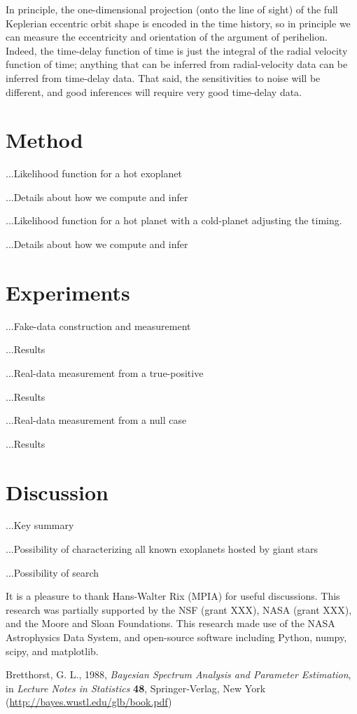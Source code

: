 \documentclass[12pt, preprint]{aastex}
\begin{document}
In principle, the one-dimensional projection (onto the line of sight)
of the full Keplerian eccentric orbit shape is encoded in the time
history, so in principle we can measure the eccentricity and
orientation of the argument of perihelion.
Indeed, the time-delay function of time is just the integral of the
radial velocity function of time; anything that can be inferred from
radial-velocity data can be inferred from time-delay data.
That said, the sensitivities to noise will be different, and good
inferences will require very good time-delay data.

\section{Method}

...Likelihood function for a hot exoplanet

...Details about how we compute and infer

...Likelihood function for a hot planet with a cold-planet adjusting the timing.

...Details about how we compute and infer

\section{Experiments}

...Fake-data construction and measurement

...Results

...Real-data measurement from a true-positive

...Results

...Real-data measurement from a null case

...Results

\section{Discussion}

...Key summary

...Possibility of characterizing all known exoplanets hosted by giant stars

...Possibility of search

\acknowledgements
It is a pleasure to thank
  Hans-Walter Rix (MPIA)
for useful discussions.
This research was partially supported by the NSF (grant XXX), NASA
(grant XXX), and the Moore and Sloan Foundations.
This research made use of the NASA Astrophysics Data System, and
open-source software including Python, numpy, scipy, and matplotlib.

\begin{thebibliography}{}\raggedright
{}
  Bretthorst, G. L., 1988,
  \textit{Bayesian Spectrum Analysis and Parameter Estimation},
  in \textit{Lecture Notes in Statistics} \textbf{48},
  Springer-Verlag, New York
  \footnotesize{(\url{http://bayes.wustl.edu/glb/book.pdf})}
\end{thebibliography}
\end{document}

